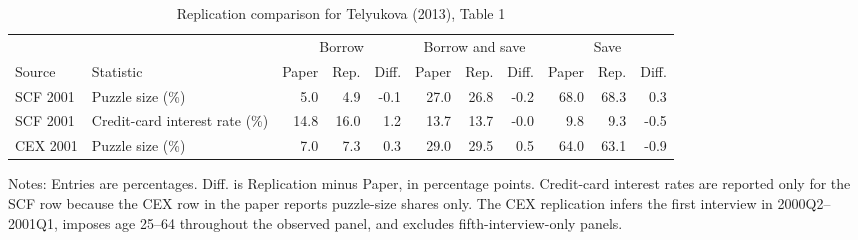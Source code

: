 \documentclass[11pt]{article}
\begin{document}
\begin{table}[!htbp]
	\centering
	\begin{threeparttable}
		\caption{Replication comparison for Telyukova (2013), Table 1}
		\label{tab:telyukova_table1_replication_comparison}
		\begingroup
		\scriptsize
		\setlength{\tabcolsep}{3pt}
		\begin{tabular}{llrrrrrrrrr}
			\toprule
			& & \multicolumn{3}{c}{Borrow} & \multicolumn{3}{c}{Borrow and save} & \multicolumn{3}{c}{Save} \\
			\cmidrule(lr){3-5} \cmidrule(lr){6-8} \cmidrule(lr){9-11}
			Source & Statistic & Paper & Rep. & Diff. & Paper & Rep. & Diff. & Paper & Rep. & Diff. \\
			\midrule
			SCF 2001 & Puzzle size (\%) & 5.0 & 4.9 & -0.1 & 27.0 & 26.8 & -0.2 & 68.0 & 68.3 & 0.3 \\
			SCF 2001 & Credit-card interest rate (\%) & 14.8 & 16.0 & 1.2 & 13.7 & 13.7 & -0.0 & 9.8 & 9.3 & -0.5 \\
			CEX 2001 & Puzzle size (\%) & 7.0 & 7.3 & 0.3 & 29.0 & 29.5 & 0.5 & 64.0 & 63.1 & -0.9 \\
			\bottomrule
		\end{tabular}
		\endgroup
		\begin{tablenotes}[flushleft]
			\footnotesize
			\item Notes: Entries are percentages. Diff. is Replication minus Paper, in percentage points. Credit-card interest rates are reported only for the SCF row because the CEX row in the paper reports puzzle-size shares only. The CEX replication infers the first interview in 2000Q2--2001Q1, imposes age 25--64 throughout the observed panel, and excludes fifth-interview-only panels.
		\end{tablenotes}
	\end{threeparttable}
\end{table}
\end{document}
